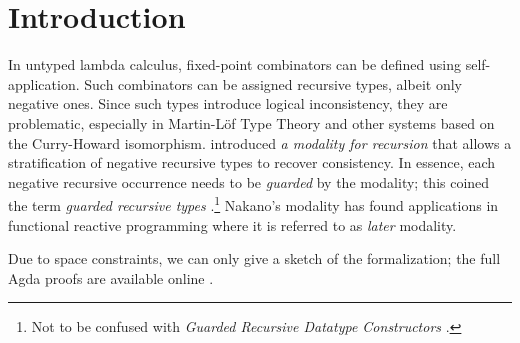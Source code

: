 
\section{Introduction}
\label{sec:intro}

In untyped lambda calculus, fixed-point combinators can be defined
using self-app\-li\-ca\-tion.  Such combinators can be assigned recursive
types, albeit only negative ones.  Since such types introduce logical
inconsistency, they are problematic, especially in Martin-L\"of
Type Theory and other systems based on the Curry-Howard isomorphism.
\citet{nakano:lics00} introduced \emph{a modality for recursion} that
allows a stratification of negative recursive types to recover
consistency.  In essence, each negative recursive occurrence needs to
be \emph{guarded} by the modality; this coined the term \emph{guarded
  recursive types} \citep{birkedalMogelberg:lics13}.\footnote{Not to
  be confused with \emph{Guarded Recursive Datatype Constructors}
  \citep{xiChenChen:popl03}.} 
Nakano's modality has found applications in functional reactive
programming \citep{krishnaswamiBenton:lics11} where it is referred to
as \emph{later} modality.

Due to space constraints, we can only give a sketch of the
formalization; the full Agda proofs are available online
\citep{abelVezzosi:guardedNormalization}. 

